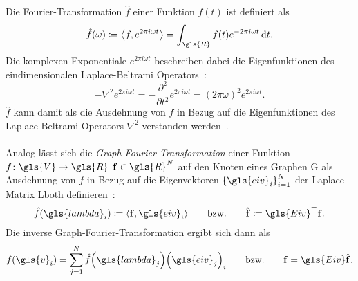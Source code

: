Die Fourier-Transformation $\hat f$ einer Funktion $f\left(t\right)$ ist definiert als~\cite{Shuman}
\begin{equation*}
  \hat f\left(\omega\right) \coloneqq \left\langle f, e^{2\pi i\omega t} \right\rangle = \int_{\gls{R}} f\left(t\right)e^{-2\pi i\omega t}\,\mathrm{d}t.
\end{equation*}
Die komplexen Exponentiale $e^{2\pi i\omega t}$ beschreiben dabei die Eigenfunktionen des eindimensionalen Laplace-Beltrami Operators~\cite{Shuman}:
\begin{equation}
  - \nabla^2 e^{2\pi i\omega t} = - \frac{\partial^2}{\partial t^2} e^{2\pi i \omega t} = {\left(2\pi \omega\right)}^2 e^{2\pi i\omega t}.
  \label{eq:laplace_eigenfunktionen}
\end{equation}
$\hat f$ kann damit als die Ausdehnung von $f$ in Bezug auf die Eigenfunktionen des Laplace-Beltrami Operators $\nabla^2$ verstanden werden~\cite{Hammond}.
\\\\
Analog lässt sich die \emph{Graph-Fourier-Transformation} einer Funktion $f \colon \gls{V} \to \gls{R}$ \bzw{} $\ve{f} \in \gls{R}^N$ auf den Knoten eines Graphen \gls{G} als Ausdehnung von $f$ in Bezug auf die Eigenvektoren ${\left\{\gls{eiv}_i\right\}}_{i=1}^N$ der Laplace-Matrix \gls{Lboth} definieren~\cite{Shuman}:
\begin{equation}
  \hat f\left(\gls{lambda}_i\right) \coloneqq \left\langle \ve{f}, \gls{eiv}_i \right\rangle
  \qquad
  \text{\bzw{}}
  \qquad
  \ve{\hat f} \coloneqq \gls{Eiv}^{\top}\ve{f}.
  \label{eq:graph_fourier_transformation}
\end{equation}
Die inverse Graph-Fourier-Transformation ergibt sich dann als~\cite{Shuman}
\begin{equation}
  f\left(\gls{v}_i\right) = \sum_{j=1}^N \hat f\left(\gls{lambda}_j\right) {\left(\gls{eiv}_j\right)}_i
  \qquad
  \text{\bzw{}}
  \qquad
  \ve{f} = \gls{Eiv}\ve{\hat f}.
  \label{eq:inverse_graph_fourier_transformation}
\end{equation}

